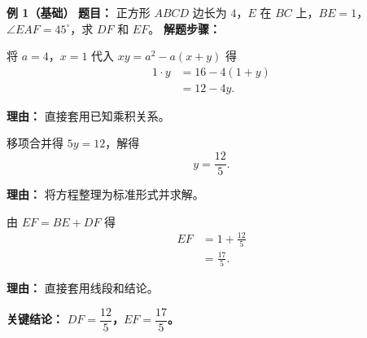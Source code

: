 \begin{examplebox}
	\textbf{\textcolor{CExample}{例 1（基础）}}
	\textbf{\textcolor{CExample}{题目：}}
	正方形 $ABCD$ 边长为 $4$，$E$ 在 $BC$ 上，$BE=1$，$\angle EAF=45^\circ$，求 $DF$ 和 $EF$。
	\textbf{\textcolor{CExample}{解题步骤：}}
	\begin{description}[style=nextline, leftmargin=2.8em, labelsep=0.5em, itemsep=0.45em]
		\item[\textbf{第一步（代入乘积关系）：}]
			将 $a=4$，$x=1$ 代入 $xy = a^2 - a(x+y)$ 得
			\[
				\begin{aligned}
					1\cdot y &= 16 - 4(1+y) \\ &= 12 - 4y.
			\end{aligned}
			\]
			\par\textbf{理由：} 直接套用已知乘积关系。
		\item[\textbf{第二步（解一元方程）：}]
			移项合并得 $5y=12$，解得
			\[
				y = \frac{12}{5}.
			\]
			\par\textbf{理由：} 将方程整理为标准形式并求解。
		\item[\textbf{第三步（线段求和）：}]
			由 $EF = BE + DF$ 得
			\[
				\begin{aligned}
					EF &= 1 + \frac{12}{5} \\ &= \frac{17}{5}.
			\end{aligned}
			\]
			\par\textbf{理由：} 直接套用线段和结论。
	\end{description}
	\textbf{\textcolor{CExample}{关键结论：}}
	\textbf{$DF = \dfrac{12}{5}$，$EF = \dfrac{17}{5}$。}


\end{examplebox}
